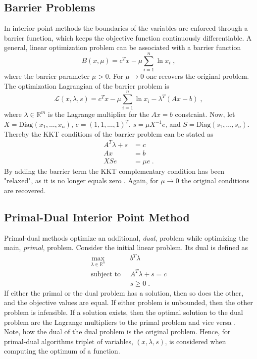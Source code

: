 \subsection{Barrier Problems}
In interior point methods the boundaries of the variables are enforced through a barrier function, which keeps the objective function continuously differentiable.
A general, linear optimization problem can be associated with a barrier function
\begin{equation}
	B(x , \mu) = c^T x - \mu \sum_{i=1}^{n} \ln x_i \; ,
\end{equation} 
where the barrier parameter $\mu > 0$. For $\mu \to 0$ one recovers the original problem.
The optimization Lagrangian of the barrier problem is
\begin{equation}
	\mathcal{L}(x, \lambda, s) = c^T x - \mu \sum_{i=1}^{n} \ln x_i - \lambda^T (A x -b) \; ,
\end{equation}
where $\lambda \in \mathbb{R}^m$ is the Lagrange multiplier for the $A x = b$ constraint. Now, let $X = \mathrm{Diag}(x_1 , \ldots , x_n)$, $e = (1,1, \ldots , 1)^T$, $s = \mu X^{-1} e$, and $S = \mathrm{Diag}(s_1 , \ldots , s_n)$. Thereby the KKT conditions of the barrier problem can be stated as 
\begin{subequations}
\begin{align}
	A^T \lambda + s &= c \\
	A x &= b \\
	X S e &= \mu e \; .
\end{align}
\end{subequations}
By adding the barrier term the KKT complementary condition has been "relaxed", as it is no longer equals zero \cite{ipnote}. Again, for $\mu \to 0$ the original conditions are recovered. 


\subsection{Primal-Dual Interior Point Method}
Primal-dual methods optimize an additional, \textit{dual}, problem while optimizing the main, \textit{primal}, problem.
Consider the initial linear problem. Its dual is defined as 
\begin{align*}
	\max_{\lambda \in \mathbb{R}^n} \;  & \; b^T \lambda \\
	\text{subject to} \;  & \; A^T \lambda + s = c  \\
							& \; s \geq 0 \; .
\end{align*}
If either the primal or the dual problem has a solution, then so does the other, and the objective values are equal. If either problem is unbounded, then the other problem is infeasible. If a solution exists, then the optimal solution to the dual problem are the Lagrange multipliers to the primal problem and vice versa \cite{wright}. Note, how the dual of the dual problem is the original problem.
Hence, for primal-dual algorithms triplet of variables, $(x , \lambda , s)$, is considered when computing the optimum of a function.\\

